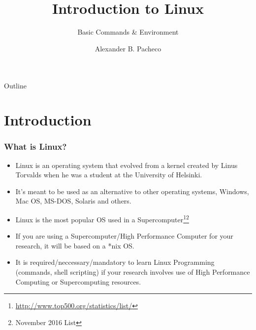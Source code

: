 \documentclass[10pt,t]{beamer}
\title{Introduction to Linux}
\subtitle{Basic Commands \& Environment}
\author{Alexander B. Pacheco}
\institute{\href{http://researchcomputing.lehigh.edu}{LTS Research Computing}}%
\date{ }
\begin{document}
\begin{frame}[c]
  \titlepage
\end{frame}

\footnotesize
\begin{frame}{Outline}
  \tableofcontents
\end{frame}

\section{Introduction}
\begin{frame}
  \frametitle{What is Linux?}
  \begin{itemize}
    \item Linux is an operating system that evolved from a kernel created by Linus Torvalds when he was a student at the University of Helsinki. 
    \item It's meant to be used as an alternative to other operating systems, Windows, Mac OS, MS-DOS, Solaris and others. 
    \item Linux is the most popular OS used in a Supercomputer\let\thefootnote\relax\footnote{\tiny \url{http://www.top500.org/statistics/list/}}\let\thefootnote\relax\footnote{\tiny November 2016 List}
      
    \item If you are using a Supercomputer/High Performance Computer for your research, it will be based on a *nix OS.
    \item It is required/neccessary/mandatory to learn Linux Programming (commands, shell scripting) if your research involves use of High Performance Computing or Supercomputing resources.
  \end{itemize}
\end{frame}
\end{document}
